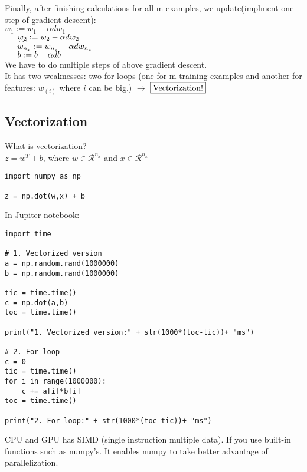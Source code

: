 \documentclass{article}
\begin{document}
Finally, after finishing calculations for all m examples, we update(implment one step of gradient descent):\\

$w_1 := w_1 - \alpha dw_1$\\
$\indent w_2 := w_2 - \alpha dw_2$\\
$\indent \dots$ \\
$\indent w_{n_x} := w_{n_x} - \alpha dw_{n_x}$\\
$\indent b := b - \alpha db $\\

We have to do multiple steps of above gradient descent.\\

It has two weaknesses: two for-loops (one for m training examples and another for features: $w_{(i)}$ where $i$ can be big.) $\rightarrow$ $\fbox{Vectorization!}$

\newpage
\subsection{Vectorization}

What is vectorization?\\

$z = w^T+b$, where $w \in \mathcal{R}^{n_x}$ and $x \in \mathcal{R}^{n_x}$\\
\lstset{language=Python}
\begin{lstlisting}
import numpy as np

z = np.dot(w,x) + b
\end{lstlisting}


In Jupiter notebook:\\

\lstset{language=Python}
\begin{lstlisting}
import time

# 1. Vectorized version
a = np.random.rand(1000000)
b = np.random.rand(1000000)

tic = time.time()
c = np.dot(a,b)
toc = time.time()

print("1. Vectorized version:" + str(1000*(toc-tic))+ "ms")

# 2. For loop
c = 0
tic = time.time()
for i in range(1000000):
    c += a[i]*b[i]
toc = time.time()

print("2. For loop:" + str(1000*(toc-tic))+ "ms")
\end{lstlisting}

CPU and GPU has SIMD (single instruction multiple data). If you use built-in functions such as numpy's. It enables numpy to take better advantage of parallelization.
\end{document}
